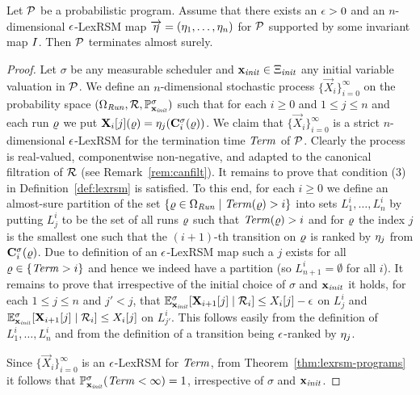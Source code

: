 \begin{theorem}
\label{thm:lexrsm-programs}
Let $\mathcal{P}$ be a probabilistic program. Assume that there exists an $\epsilon>0$ 
and an $n$-dimensional $\epsilon$-LexRSM map 
$\overrightarrow{\eta}=(\eta_1,\dots,\eta_n)$ for 
$\mathcal{P}$ supported 
by some 
invariant map $I$. 
Then $\mathcal{P}$ terminates almost surely.
\end{theorem}
\begin{proof}
Let $\sigma$ be any measurable scheduler and $\mathbf{x}_{\mathit{init}}\in\Xi_{\mathit{init}}$ any 
initial variable valuation in $\mathcal{P}$.
We define an $n$-dimensional stochastic process 
$\{\vec{X}_{i}\}_{i=0}^{\infty} $ on the probability space 
$(\Omega_{\mathit{Run}},\mathcal{R},\mathbb{P}^{\sigma}_{\mathbf{x}_{\mathit{init}}})$ such 
that for each 
$i\geq 0$ and $1\leq j 
\leq n$ and each run $\varrho$ we put $\mathbf{X}_{i}[j](\varrho) = 
\eta_j(\mathbf{C}^{\sigma}_{i}(\varrho))$. We claim that $\{\vec{X}_{i}\}_{i=0}^{\infty}$ 
is a strict $n$-dimensional $\epsilon$-LexRSM for the termination time $\mathit{Term}$ of $\mathcal{P}$. Clearly 
the process is real-valued, componentwise non-negative, and adapted to the 
canonical filtration of $\mathcal{R}$ (see Remark~\ref{rem:canfilt}). It remains 
to prove that condition 
(3) in 
Definition~\ref{def:lexrsm} is satisfied. To this end, for each $i\geq 0$ we 
define an almost-sure partition of the set $\{\varrho\in \Omega_{\mathit{Run}}\mid 
\mathit{Term}(\varrho) >i\}$ into sets $L^{i}_1,\dots,L^{i}_n$ by putting $L^i_j$ to be 
the set of all runs $\varrho$ such that $\mathit{Term}(\varrho)>i$ and for $\varrho$ the index 
$j$ is the smallest one such that the $(i+1)$-th transition on $\varrho$ is ranked 
by $\eta_j$ from $\mathbf{C}^{\sigma}_{i}(\varrho)$. Due to 
definition of an $\epsilon$-LexRSM map such a $j$ exists for all 
$\varrho\in\{\mathit{Term}>i\}$ and hence we indeed have a partition (so $L^i_{n+1}=\emptyset$ for all $i$). It remains to prove 
that irrespective of the initial choice of $\sigma$ and $\mathbf{x}_{\mathit{init}}$ it holds, 
for each $1\leq j 
\leq n$ and $j'<j$, that $\mathbb{E}^\sigma_{\mathbf{x}_{\mathit{init}}}[\mathbf{X}_{i+1}[j]\mid 
\mathcal{R}_i]\leq X_i[j]-\epsilon $ on $L_j^i$ and 
$\mathbb{E}^\sigma_{\mathbf{x}_{\mathit{init}}}[\mathbf{X}_{i+1}[j]\mid 
\mathcal{R}_i]\leq X_i[j] $ on $L_{j'}^i$. This follows easily from 
the definition of $L^{i}_1,\dots,L^{i}_n$ and from the definition of a 
transition being $\epsilon$-ranked by $\eta_j$.

Since  $\{\vec{X}_{i}\}_{i=0}^{\infty}$ 
is an $\epsilon$-LexRSM for $\mathit{Term}$, from Theorem~\ref{thm:lexrsm-programs} it 
follows that $\mathbb{P}^{\sigma}_{\mathbf{x}_{\mathit{init}}}(\mathit{Term} <\infty) =1$, irrespective of 
$\sigma$ and $\mathbf{x}_{\mathit{init}}$.
\end{proof} 

